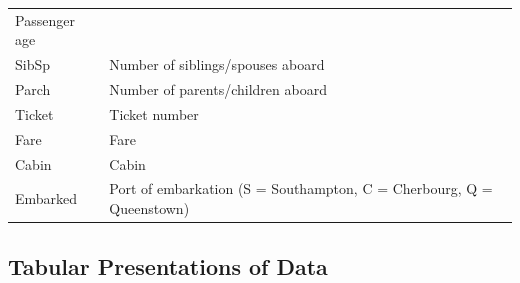\documentclass[]{book}
\begin{document}
\begin{longtable}[]{@{}ll@{}}
\begin{minipage}[t]{0.45\columnwidth}
Passenger age\strut
\end{minipage}\tabularnewline
\begin{minipage}[t]{0.49\columnwidth}\raggedright
SibSp\strut
\end{minipage} & \begin{minipage}[t]{0.45\columnwidth}\raggedright
Number of siblings/spouses aboard\strut
\end{minipage}\tabularnewline
\begin{minipage}[t]{0.49\columnwidth}\raggedright
Parch\strut
\end{minipage} & \begin{minipage}[t]{0.45\columnwidth}\raggedright
Number of parents/children aboard\strut
\end{minipage}\tabularnewline
\begin{minipage}[t]{0.49\columnwidth}\raggedright
Ticket\strut
\end{minipage} & \begin{minipage}[t]{0.45\columnwidth}\raggedright
Ticket number\strut
\end{minipage}\tabularnewline
\begin{minipage}[t]{0.49\columnwidth}\raggedright
Fare\strut
\end{minipage} & \begin{minipage}[t]{0.45\columnwidth}\raggedright
Fare\strut
\end{minipage}\tabularnewline
\begin{minipage}[t]{0.49\columnwidth}\raggedright
Cabin\strut
\end{minipage} & \begin{minipage}[t]{0.45\columnwidth}\raggedright
Cabin\strut
\end{minipage}\tabularnewline
\begin{minipage}[t]{0.49\columnwidth}\raggedright
Embarked\strut
\end{minipage} & \begin{minipage}[t]{0.45\columnwidth}\raggedright
Port of embarkation (S = Southampton, C = Cherbourg, Q = Queenstown)\strut
\end{minipage}\tabularnewline
\bottomrule
\end{longtable}

\hypertarget{tabular-presentations-of-data}{%
\subsection{Tabular Presentations of Data}\label{tabular-presentations-of-data}}
\end{document}
